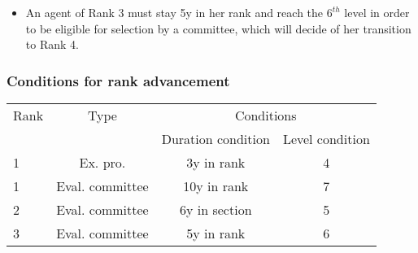 \documentclass[xcolor=table,ignorenonframetext,12pt]{beamer}
\begin{document}
\begin{frame}
\begin{itemize}
	\item An agent of Rank 3 must stay 5y in her rank and reach the $6^{th}$ level in order to be eligible for selection by a committee, which will decide of her transition to Rank 4.\\
\end{itemize}
\frametitle{Conditions for rank advancement}
\begin{table}
	\small
	\begin{tabular}{l|c|cc}
		
		\toprule
		Rank  & Type &  \multicolumn{2}{c}{Conditions}  \\
		&  			&  Duration condition	&  Level condition \\
		\midrule
		1  &	Ex. pro. 	&   3y in rank  & 	4  \\
		1  &	Eval. committee 	& 	10y in rank &	7   \\ \midrule
		2  &   Eval. committee		& 	6y in section  &	5   \\ \midrule
		3  &   Eval. committee		& 	5y in rank  &	6   \\	
		\bottomrule
	\end{tabular}
\end{table}
\end{frame}



\end{document}
